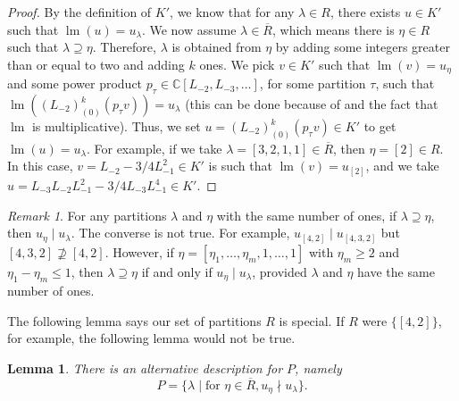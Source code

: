 \documentclass[a4paper, 12pt, reqno]{amsart}
\newtheorem{lemma}[theorem]{Lemma}
\theoremstyle{remark}
\newtheorem{remark}[theorem]{Remark}
\numberwithin{equation}{subsection}
\DeclareMathOperator{\lm}{lm}
\begin{document}
\begin{proof}
  By the definition of $K'$, we know that for any $\lambda \in R$, there exists $u \in K'$ such that $\lm(u) = u_{\lambda}$.
  We now assume $\lambda \in \overline{R}$, which means there is $\eta \in R$ such that $\lambda \supseteq \eta$.
  Therefore, $\lambda$ is obtained from $\eta$ by adding some integers greater than or equal to two and adding $k$ ones.
  We pick $v \in K'$ such that $\lm(v) = u_{\eta}$ and some power product $p_{\tau} \in \mathbb{C}[L_{-2}, L_{-3}, \dots]$, for some partition $\tau$, such that $\lm((L_{-2})^k_{(0)}(p_{\tau}v)) = u_{\lambda}$ (this can be done because of  and the fact that $\lm$ is multiplicative).
  Thus, we set $u = (L_{-2})^k_{(0)}(p_{\tau}v) \in K'$ to get $\lm(u) = u_{\lambda}$.
  For example, if we take $\lambda = [3, 2, 1, 1] \in \overline{R}$, then $\eta = [2] \in R$.
  In this case, $v = L_{-2}- 3/4L_{-1}^2 \in K'$ is such that $\lm(v) = u_{[2]}$, and we take $u = L_{-3}L_{-2}L_{-1}^2 - 3/4L_{-3}L_{-1}^4 \in K'$.
\end{proof}

\begin{remark}
  \label{rmk:46}
  For any partitions $\lambda$ and $\eta$ with the same number of ones, if $\lambda \supseteq \eta$, then $u_{\eta} \mid u_{\lambda}$.
  The converse is not true.
  For example, $u_{[4, 2]} \mid u_{[4, 3, 2]}$ but $[4, 3, 2] \nsupseteq [4, 2]$.
  However, if $\eta = [\eta_1, \dots, \eta_m, 1, \dots, 1]$ with $\eta_m \ge 2$ and $\eta_1 - \eta_m \le 1$, then $\lambda \supseteq \eta$ if and only if $u_{\eta} \mid u_{\lambda}$, provided $\lambda$ and $\eta$ have the same number of ones.
\end{remark}

The following lemma says our set of partitions $R$ is special.
If $R$ were $\{[4, 2]\}$, for example, the following lemma would not be true.

\begin{lemma}
  \label{lmm:35}
  There is an alternative description for $P$, namely
  \begin{equation*}
    P = \{\lambda \mid \text{for }\eta \in \overline{R}, u_{\eta} \nmid u_{\lambda}\}.
  \end{equation*}
\end{lemma}
\end{document}

